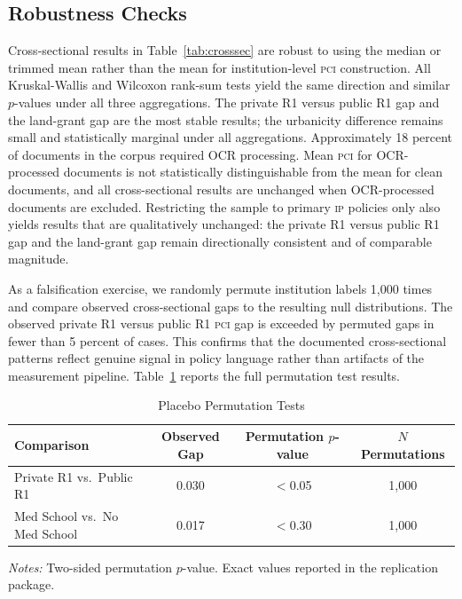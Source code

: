 \documentclass[12pt]{article}
\newcommand{\PCI}{\textsc{pci}}
\newcommand{\IP}{\textsc{ip}}
\begin{document}
\begin{appendices}
\section{Robustness Checks}
\label{app:robust}

Cross-sectional results in Table~\ref{tab:crosssec} are robust to using the median
or trimmed mean rather than the mean for institution-level \PCI{} construction.  All
Kruskal-Wallis and Wilcoxon rank-sum tests yield the same direction and similar
$p$-values under all three aggregations.  The private R1 versus public R1 gap and the
land-grant gap are the most stable results; the urbanicity difference remains small
and statistically marginal under all aggregations.  Approximately 18 percent of
documents in the corpus required OCR processing.  Mean \PCI{} for OCR-processed
documents is not statistically distinguishable from the mean for clean documents, and
all cross-sectional results are unchanged when OCR-processed documents are excluded.
Restricting the sample to primary \IP{} policies only also yields results that are
qualitatively unchanged: the private R1 versus public R1 gap and the land-grant gap
remain directionally consistent and of comparable magnitude.

As a falsification exercise, we randomly permute institution labels 1,000 times and
compare observed cross-sectional gaps to the resulting null distributions.  The
observed private R1 versus public R1 \PCI{} gap is exceeded by permuted gaps in fewer
than 5 percent of cases.  This confirms that the documented cross-sectional patterns
reflect genuine signal in policy language rather than artifacts of the measurement
pipeline.  Table~\ref{tab:perm} reports the full permutation test results.

\begin{table}[H]
\centering
\caption{Placebo Permutation Tests}
\label{tab:perm}
\begin{threeparttable}
\small
\begin{tabular}{lccc}
\toprule
\textbf{Comparison} & \textbf{Observed Gap} & \textbf{Permutation $p$-value} & \textbf{$N$ Permutations} \\
\midrule
Private R1 vs.\ Public R1     & 0.030 & $<$0.05 & 1,000 \\
Med School vs.\ No Med School & 0.017 & $<$0.30 & 1,000 \\
\bottomrule
\end{tabular}
\begin{tablenotes}
\small
\item \textit{Notes:} Two-sided permutation $p$-value.  Exact values reported in
  the replication package.
\end{tablenotes}
\end{threeparttable}
\end{table}


\end{appendices}
\end{document}
